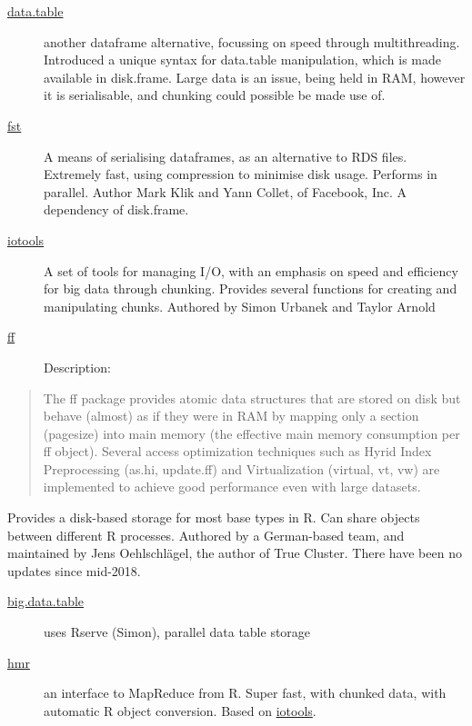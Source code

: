 \documentclass[a4paper, 11pt]{article}
\begin{document}
\begin{description}
\item[{\href{http://r-datatable.com}{data.table}}] another dataframe alternative, focussing on speed
through multithreading. Introduced a unique syntax for data.table
manipulation, which is made available in disk.frame. Large data
is an issue, being held in RAM, however it is serialisable, and
chunking could possible be made use of.
\item[{\href{https://fstpackage.github.io}{fst}}] A means of serialising dataframes, as an alternative to RDS
files. Extremely fast, using compression to minimise disk usage.
Performs in parallel. Author Mark Klik and Yann Collet, of
Facebook, Inc. A dependency of disk.frame.
\item[{\href{http://www.rforge.net/iotools}{iotools}}] A set of tools for managing I/O, with an emphasis on
speed and efficiency for big data through chunking. Provides
several functions for creating and manipulating chunks. Authored
by Simon Urbanek and Taylor Arnold
\item[{\href{http://ff.r-forge.r-project.org/}{ff}}] Description:
\end{description}
\begin{quote}
The ff package provides atomic data structures that are stored on disk
but behave (almost) as if they were in RAM by mapping only a section
(pagesize) into main memory (the effective main memory consumption per
ff object). Several access optimization techniques such as Hyrid Index
Preprocessing (as.hi, update.ff) and Virtualization (virtual, vt, vw)
are implemented to achieve good performance even with large datasets.
\end{quote}
Provides a disk-based storage for most base types in R. Can share
objects between different R processes. Authored by a German-based
team, and maintained by Jens Oehlschlägel, the author of True Cluster.
There have been no updates since mid-2018.
\begin{description}
\item[{\href{https://gitlab.com/jangorecki/big.data.table}{big.data.table}}] uses Rserve (Simon), parallel data table storage
\item[{\href{https://github.com/s-u/hmr}{hmr}}] an interface to MapReduce from R. Super fast, with chunked
data, with automatic R object conversion. Based on \href{https://github.com/s-u/iotools}{iotools}.
\end{description}
\end{document}

